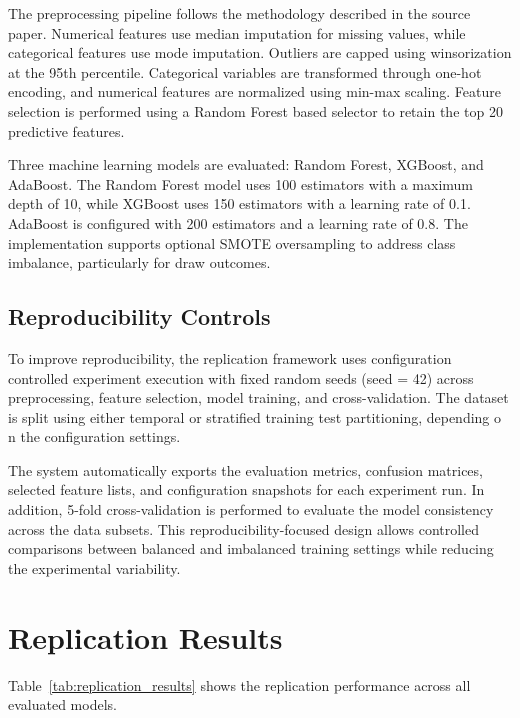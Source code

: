 \documentclass[11pt]{article}
\begin{document}
The preprocessing pipeline follows the methodology described in the source paper. Numerical features use median imputation for missing values, while categorical features use mode imputation. Outliers are capped using winsorization at the 95th percentile. Categorical variables are transformed through one-hot encoding, and numerical features are normalized using min-max scaling. Feature selection is performed using a Random Forest based selector to retain the top 20 predictive features.

Three machine learning models are evaluated: Random Forest, XGBoost, and AdaBoost. The Random Forest model uses 100 estimators with a maximum depth of 10, while XGBoost uses 150 estimators with a learning rate of 0.1. AdaBoost is configured with 200 estimators and a learning rate of 0.8. The implementation supports optional SMOTE oversampling to address class imbalance, particularly for draw outcomes.


\subsection{Reproducibility Controls}

To improve reproducibility, the replication framework uses configuration controlled experiment execution with fixed random seeds (seed = 42) across preprocessing, feature selection, model training, and cross-validation. The dataset is split using either temporal or stratified training test partitioning, depending o n the configuration settings.

The system automatically exports the evaluation metrics, confusion matrices, selected feature lists, and configuration snapshots for each experiment run. In addition, 5-fold cross-validation is performed to evaluate the model consistency across the data subsets. This reproducibility-focused design allows controlled comparisons between balanced and imbalanced training settings while reducing the experimental variability.

\section{Replication Results}

Table~\ref{tab:replication_results} shows the replication performance across all evaluated models.
\end{document}
